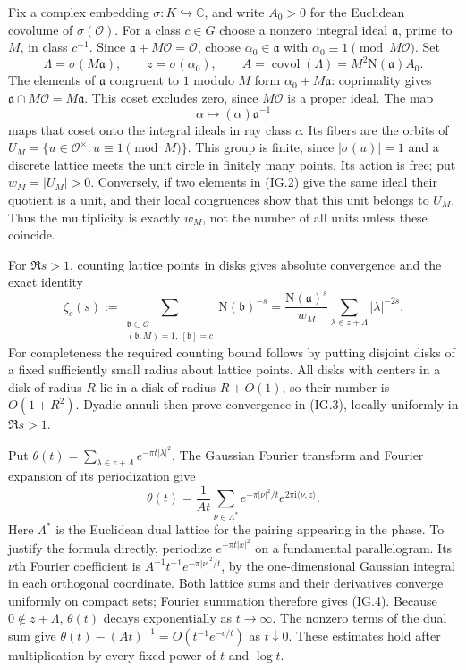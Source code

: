 Fix a complex embedding $\sigma:K\hookrightarrow\mathbb C$, and
write $A_0>0$ for the Euclidean covolume of $\sigma(\mathcal O)$.
For a class $c\in G$ choose a nonzero integral ideal $\mathfrak a$,
prime to $M$, in class $c^{-1}$. Since
$\mathfrak a+M\mathcal O=\mathcal O$, choose
$\alpha_0\in\mathfrak a$ with $\alpha_0\equiv1\pmod {M\mathcal O}$.
Set
\[
 \Lambda=\sigma(M\mathfrak a),\qquad z=\sigma(\alpha_0),
 \qquad A=\operatorname{covol}(\Lambda)
       =M^2\mathrm N(\mathfrak a)A_0.                  \tag{IG.1}
\]
The elements of $\mathfrak a$ congruent to $1$ modulo $M$ form
$\alpha_0+M\mathfrak a$: coprimality gives
$\mathfrak a\cap M\mathcal O=M\mathfrak a$.
This coset excludes zero, since $M\mathcal O$ is a proper ideal.
The map
\[
 \alpha\longmapsto(\alpha)\mathfrak a^{-1}
                                                               \tag{IG.2}
\]
maps that coset onto the integral ideals in ray class $c$.
Its fibers are the orbits of
$U_M=\{u\in\mathcal O^\times:u\equiv1\pmod M\}$.
This group is finite, since $|\sigma(u)|=1$ and a discrete lattice
meets the unit circle in finitely many points. Its action is free;
put $w_M=|U_M|>0$. Conversely, if two elements in (IG.2) give the
same ideal their quotient is a unit, and their local congruences
show that this unit belongs to $U_M$. Thus the multiplicity is
exactly $w_M$, not the number of all units unless these coincide.

For $\Re s>1$, counting lattice points in disks gives absolute
convergence and the exact identity
\[
 \zeta_c(s):=\sum_{\substack{\mathfrak b\subset\mathcal O\\
                       (\mathfrak b,M)=1,\ [\mathfrak b]=c}}
                \mathrm N(\mathfrak b)^{-s}
 =\frac{\mathrm N(\mathfrak a)^s}{w_M}
       \sum_{\lambda\in z+\Lambda}|\lambda|^{-2s}.    \tag{IG.3}
\]
For completeness the required counting bound follows by putting
disjoint disks of a fixed sufficiently small radius about lattice
points. All disks with centers in a disk of radius $R$ lie in a
disk of radius $R+O(1)$, so their number is $O(1+R^2)$.
Dyadic annuli then prove convergence in (IG.3), locally uniformly
in $\Re s>1$.

Put $\theta(t)=\sum_{\lambda\in z+\Lambda}e^{-\pi t|\lambda|^2}$.
The Gaussian Fourier transform and Fourier expansion of its
periodization give
\[
 \theta(t)=\frac1{At}
       \sum_{\nu\in\Lambda^*}
          e^{-\pi|\nu|^2/t}e^{2\pi\mathrm i\langle\nu,z\rangle}.
                                                               \tag{IG.4}
\]
Here $\Lambda^*$ is the Euclidean dual lattice for the pairing
appearing in the phase. To justify the formula directly, periodize
$e^{-\pi t|x|^2}$ on a fundamental parallelogram. Its $\nu$th
Fourier coefficient is $A^{-1}t^{-1}e^{-\pi|\nu|^2/t}$, by the
one-dimensional Gaussian integral in each orthogonal coordinate.
Both lattice sums and their derivatives converge uniformly on
compact sets; Fourier summation therefore gives (IG.4).
Because $0\notin z+\Lambda$, $\theta(t)$ decays exponentially as
$t\to\infty$. The nonzero terms of the dual sum give
$\theta(t)-(At)^{-1}=O(t^{-1}e^{-c/t})$ as $t\downarrow0$.
These estimates hold after multiplication by every fixed power
of $t$ and $\log t$.

